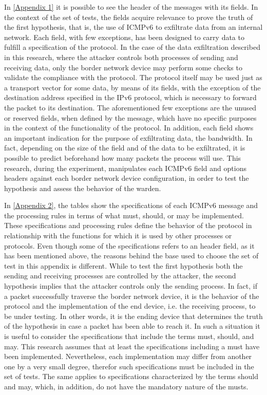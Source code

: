 \documentclass[12pt]{article}
\begin{document}
In \ref{Appendix 1} it is possible to see the header of the messages with its fields. In the context of the set of tests, the fields acquire relevance to prove the truth of the first hypothesis, that is, the use of ICMPv6 to exfiltrate data from an internal network. Each field, with few exceptions, has been designed to carry data to fulfill a specification of the protocol. In the case of the data exfiltration described in this research, where the attacker controls both processes of sending and receiving data, only the border network device may perform some checks to validate the compliance with the protocol. The protocol itself may be used just as a transport vector for some data, by means of its fields, with the exception of the destination address specified in the IPv6 protocol, which is necessary to forward the packet to its destination. The aforementioned few exceptions are the unused or reserved fields, when defined by the message, which have no specific purposes in the context of the functionality of the protocol. In addition, each field shows an important indication for the purpose of exfiltrating data, the bandwidth. In fact, depending on the size of the field and of the data to be exfiltrated, it is possible to predict beforehand how many packets the process will use. This research, during the experiment, manipulates each ICMPv6 field and options headers against each border network device configuration, in order to test the hypothesis and assess the behavior of the warden.

In \ref{Appendix 2}, the tables show the specifications of each ICMPv6 message and the processing rules in terms of what must, should, or may be implemented. These specifications and processing rules define the behavior of the protocol in relationship with the functions for which it is used by other processes or protocols. Even though some of the specifications refers to an header field, as it has been mentioned above, the reasons behind the base used to choose the set of test in this appendix is different. While to test the first hypothesis both the sending and receiving processes are controlled by the attacker, the second hypothesis implies that the attacker controls only the sending process. In fact, if a packet successfully traverse the border network device, it is the behavior of the protocol and the implementation of the end device, i.e. the receiving process, to be under testing. In other words, it is the ending device that determines the truth of the hypothesis in case a packet has been able to reach it. In such a situation it is useful to consider the specifications that include the terms must, should, and may. This research assumes that at least the specifications including a must have been implemented. Nevertheless, each implementation may differ from another one by a very small degree, therefor such specifications must be included in the set of tests. The same applies to specifications characterized by the terms should and may, which, in addition, do not have the mandatory nature of the musts. 
\end{document}
